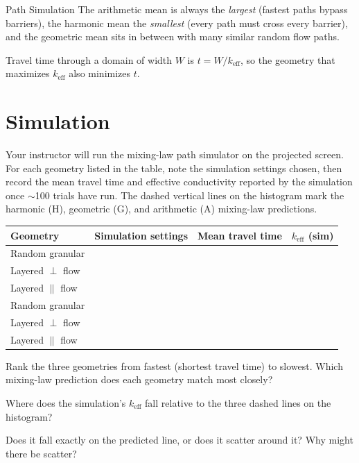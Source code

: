 \begin{activity}[Demo]{Path Simulation}
\noindent
The arithmetic mean is always the \emph{largest} (fastest paths bypass barriers), the harmonic mean the \emph{smallest} (every path must cross every barrier), and the geometric mean sits in between with many similar random flow paths.

Travel time through a domain of width $W$ is $t = W / k_\text{eff}$, so the geometry that maximizes $k_\text{eff}$ also minimizes $t$.

\section*{Simulation}

Your instructor will run the mixing-law path simulator on the projected screen.  For each geometry listed in the table, note the simulation settings chosen, then record the mean travel time and effective conductivity reported by the simulation once $\sim$100 trials have run.  The dashed vertical lines on the histogram mark the harmonic (H), geometric (G), and arithmetic (A) mixing-law predictions.

\renewcommand{\arraystretch}{2.0}
\begin{tabularx}{\textwidth}{@{}|l|X|X|X|@{}}
    \toprule
    \textbf{Geometry} & \textbf{Simulation settings} & \textbf{Mean travel time} & \textbf{$k_\text{eff}$ (sim)} \\
    \midrule
    Random granular   & & & \\
    \midrule
    Layered $\perp$ flow   & & & \\
    \midrule
    Layered $\parallel$ flow  & & & \\
    \midrule
    Random granular   & & & \\
    \midrule
    Layered $\perp$ flow   & & & \\
    \midrule
    Layered $\parallel$ flow  & & & \\
    \bottomrule
\end{tabularx}

\begin{questions}
        Rank the three geometries from fastest (shortest travel time) to slowest.  Which mixing-law prediction does each geometry match most closely?
        \answerbox[3cm]

        Where does the simulation's $k_\text{eff}$ fall relative to the three dashed lines on the histogram?

        Does it fall exactly on the predicted line, or does it scatter around it?  Why might there be scatter?
        \answerbox[4cm]


\end{questions}
\end{activity}
